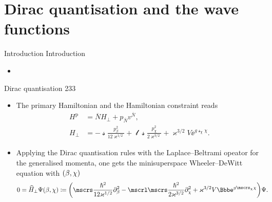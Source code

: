 \documentclass[9pt]{beamer}
\begin{document}
\section{Dirac quantisation and the wave functions}

\begin{frame}%
{Introduction}%
{Introduction}
\begin{itemize}
	\item
\end{itemize}
\end{frame}

\begin{frame}%
{Dirac quantisation}%
{233}
\begin{itemize}
\item
The primary Hamiltonian and the Hamiltonian constraint reads
\begin{align}
H^\text{p} &= \overline{N}H_\perp + p_{\overline{N}} v^{\overline{N}},
\\
H_\perp &= -\mscrs\frac{p_\beta^2}{12\varkappa^{1/2}}
+\mscrl\mscrs\frac{p_\chi^2}{2\varkappa^{3/2}}
+\varkappa^{3/2}V\ee^{g\mscrs_\chi\chi}.
\end{align}
\item
Applying the Dirac quantisation rules with the Laplace--Beltrami opeator for
the generalised momenta, one gets the minisuperspace Wheeler--DeWitt
equation with ${\left(\beta,\chi\right)}$
\begin{align}
0 &= \widehat{H}_\perp \rfun{\Psi}{\beta,\chi} \coloneqq
\rbr{\mscrs\frac{\hslash^2}{12\varkappa^{1/2}}\partial_{\beta}^2
-\mscrl\mscrs\frac{\hslash^2}{2\varkappa^{3/2}}\partial_{\chi}^2
+\varkappa^{3/2}V\ee^{g\mscrs_\chi\chi}}\Psi.
\end{align}

\end{itemize}
\end{frame}
\end{document}
